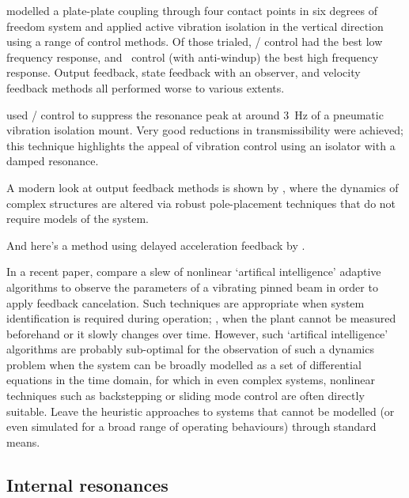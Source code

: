 \textcite{kerber2007} modelled a plate-plate coupling through four contact points in six degrees of freedom system and applied active vibration isolation in the vertical direction using a range of control methods.
Of those trialed, \Hinf/ control had the best low frequency response, and \PI\ control (with anti-windup) the best high frequency response.
Output feedback, state feedback with an observer, and velocity feedback methods all performed worse to various extents.

\textcite{chen2007} used \Hinf/ control to suppress the resonance peak at around \SI{3}{Hz} of a pneumatic vibration isolation mount.
Very good reductions in transmissibility were achieved; this technique highlights the appeal of vibration control using an isolator with a damped resonance.

A modern look at output feedback methods is shown by \cite{mottershead2008}, where the dynamics of complex structures are altered via robust pole-placement techniques that do not require models of the system.

And here's a method using delayed acceleration feedback by \textcite{chatterjee2008}.

In a recent paper, \textcite{madkour2007} compare a slew of nonlinear `artifical intelligence' adaptive algorithms to observe the parameters of a vibrating pinned beam in order to apply feedback cancelation.
Such techniques are appropriate when system identification is required during operation; \ie, when the plant cannot be measured beforehand or it slowly changes over time.
However, such `artifical intelligence' algorithms are probably sub-optimal for the observation of such a dynamics problem when the system can be broadly modelled as a set of differential equations in the time domain, for which in even complex systems, nonlinear techniques such as backstepping or sliding mode control are often directly suitable.
Leave the heuristic approaches to systems that cannot be modelled (or even simulated for a broad range of operating behaviours) through standard means.






\subsection{Internal resonances}

